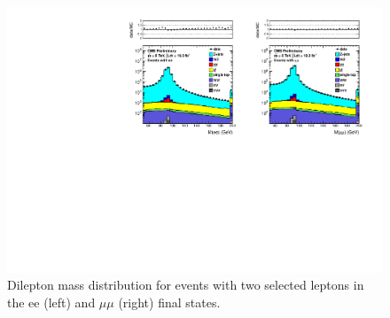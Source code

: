 \begin{figure}[hbt]
  \begin{center}
	\includegraphics[width=1.0\linewidth]{plots/dilmass_19fb.pdf}
	\caption{
	  \label{fig:dilmass}\protect 
	  Dilepton mass distribution for events with two selected leptons
	  in the ee (left) and $\mu\mu$ (right) final states.}


  \end{center}
\end{figure}


